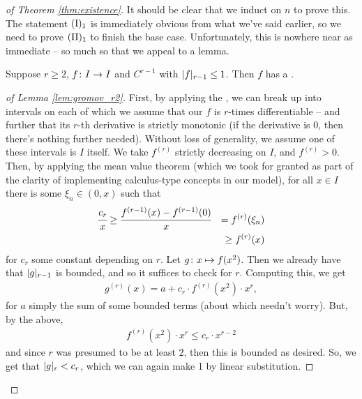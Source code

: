 \begin{proof}[of Theorem \ref{thm:existence}]
  It should be clear that we induct on $n$ to prove this. The statement $\In[1]$ is immediately obvious from what we've said earlier, so we need to prove $\IIn[1]$ to finish the base case. Unfortunately, this is nowhere near as immediate -- so much so that we appeal to a lemma.

    \begin{lemma}[Gromov]
      Suppose $r \geq 2$, $\funcdom{f}{I}{I}$  and $C^{r-1}$ with $\rnorm[r-1]{f} \leq 1$. Then $f$ has a \cellrparam.
      \label{lem:gromov_r2}
    \end{lemma}

    \begin{proof}[of Lemma \ref{lem:gromov_r2}]
      First, by applying the \SMt, we can break up into intervals on each of which we assume that our $f$ is $r$-times differentiable -- and further that its $r$-th derivative is strictly monotonic (if the derivative is 0, then there's nothing further needed). Without loss of generality, we assume one of these intervals is $I$ itself. We take $f^{(r)}$ strictly decreasing on $I$, and $f^{(r)} > 0$. Then, by applying the mean value theorem (which we took for granted as part of the clarity of implementing calculus-type concepts in our model), for all $x \in I$ there is some $\xi_n \in (0, x)$ such that
         \begin{align*}
            \cfrac{c_r}{x} &\geq \cfrac{f^{(r-1)}(x) - f^{(r-1)}(0)}{x} & = f^{(r)}(\xi_n) \\
            & &\geq f^{(r)}(x)
          \end{align*}
        for $c_r$ some constant depending on $r$. Let $\funcdef{g}{x}{f(x^2)}$. Then we already have that $\rnorm[r-1]{g}$ is bounded, and so it suffices to check for $r$. Computing this, we get
          \begin{align*}
            g^{(r)}(x) = a + c_r \cdot f^{(r)}(x^2) \cdot x^r,
          \end{align*}
        for $a$ simply the sum of some bounded terms (about which needn't worry). But, by the above,
          \begin{align*}
            f^{(r)}(x^2) \cdot x^r \leq c_r \cdot x^{r - 2}
          \end{align*}
          and since $r$ was presumed to be at least $2$, then this is bounded as desired. So, we get that $\rnorm{g} < c_r$, which we can again make 1 by linear substitution.
    \end{proof}


\end{proof}
